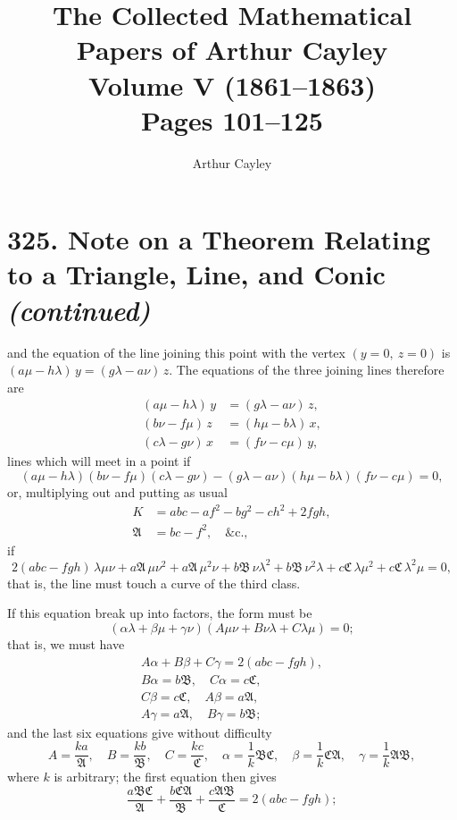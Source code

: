 \documentclass[11pt,a4paper]{article}
\title{\textbf{The Collected Mathematical Papers of Arthur Cayley}\\[6pt]
\Large Volume V (1861--1863)\\[12pt]
\large Pages 101--125}
\author{Arthur Cayley}
\date{}
\theoremstyle{plain}
\begin{document}
\maketitle
\thispagestyle{empty}
\newpage
\setcounter{page}{101}


\section*{325. Note on a Theorem Relating to a Triangle, Line, and Conic \textit{(continued)}}


\medskip

\noindent and the equation of the line joining this point with the vertex $(y=0,\ z=0)$ is $(a\mu - h\lambda)\,y = (g\lambda - a\nu)\,z$. The equations of the three joining lines therefore are
\begin{align*}
(a\mu - h\lambda)\,y &= (g\lambda - a\nu)\,z, \\
(b\nu - f\mu)\,z &= (h\mu - b\lambda)\,x, \\
(c\lambda - g\nu)\,x &= (f\nu - c\mu)\,y,
\end{align*}
lines which will meet in a point if
\[
(a\mu - h\lambda)(b\nu - f\mu)(c\lambda - g\nu) - (g\lambda - a\nu)(h\mu - b\lambda)(f\nu - c\mu) = 0,
\]
or, multiplying out and putting as usual
\begin{align*}
K &= abc - af^2 - bg^2 - ch^2 + 2fgh, \\
\mathfrak{A} &= bc - f^2, \quad \text{\&c.,}
\end{align*}
if
\[
2(abc - fgh)\,\lambda\mu\nu
+ a\mathfrak{A}\,\mu\nu^2 + a\mathfrak{A}\,\mu^2\nu
+ b\mathfrak{B}\,\nu\lambda^2 + b\mathfrak{B}\,\nu^2\lambda
+ c\mathfrak{C}\,\lambda\mu^2 + c\mathfrak{C}\,\lambda^2\mu = 0,
\]
that is, the line must touch a curve of the third class.

If this equation break up into factors, the form must be
\[
(\alpha\lambda + \beta\mu + \gamma\nu)(A\mu\nu + B\nu\lambda + C\lambda\mu) = 0;
\]
that is, we must have
\begin{gather*}
A\alpha + B\beta + C\gamma = 2(abc - fgh), \\
B\alpha = b\mathfrak{B}, \quad C\alpha = c\mathfrak{C}, \\
C\beta = c\mathfrak{C}, \quad A\beta = a\mathfrak{A}, \\
A\gamma = a\mathfrak{A}, \quad B\gamma = b\mathfrak{B};
\end{gather*}
and the last six equations give without difficulty
\[
A = \frac{ka}{\mathfrak{A}}, \quad B = \frac{kb}{\mathfrak{B}}, \quad C = \frac{kc}{\mathfrak{C}}, \quad
\alpha = \frac{1}{k}\mathfrak{B}\mathfrak{C}, \quad \beta = \frac{1}{k}\mathfrak{C}\mathfrak{A}, \quad \gamma = \frac{1}{k}\mathfrak{A}\mathfrak{B},
\]
where $k$ is arbitrary; the first equation then gives
\[
\frac{a\mathfrak{B}\mathfrak{C}}{\mathfrak{A}} + \frac{b\mathfrak{C}\mathfrak{A}}{\mathfrak{B}} + \frac{c\mathfrak{A}\mathfrak{B}}{\mathfrak{C}} = 2(abc - fgh);
\]
\end{document}
